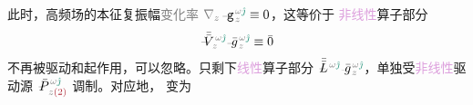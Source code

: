 此时，\textcolor{NavyBlue}{高频场}的\textcolor{PineGreen}{本征复振幅}\textcolor{gray}{变化率} $\mathcolor{gray}{\nabla_z} \xint{\begin{smallmatrix} ~ \\ {}^{}_{\mathcolor{gray}{-}} \\ ~ \end{smallmatrix}}{09}{\mathtt{g}}^{\;\!\mathcolor{gray}{\omega} \textcolor{PineGreen}{\hat{\jmath}}}_{\;\! \mathcolor{gray}{z}} \equiv 0$，这等价于 \textcolor{Plum}{非线性}算子部分
\begin{align} \label{eq:nonlinear(2)-wave_wkrho-EO-spectrum-V}
 \xint{\mathcolor{gray}{-}}{21}{\bar{\bar{V}}}^{\;\! \mathcolor{gray}{\omega} \textcolor{PineGreen}{\hat{\jmath}}}_{\;\! \mathcolor{gray}{z}} \xint{{}^{}_{\mathcolor{gray}{-}}}{10}{\bar{g}}^{\;\!\mathcolor{gray}{\omega} \textcolor{PineGreen}{\hat{\jmath}}}_{\;\! \mathcolor{gray}{z}} \equiv \bar{0}
\end{align} 
不再被驱动和起作用，可以忽略。只剩下\textcolor{Plum}{线性}算子部分 $\xint{\mathcolor{gray}{-}}{30}{\bar{\bar{L}}}^{\;\! \mathcolor{gray}{\omega} \textcolor{PineGreen}{\hat{\jmath}}} \xint{{}^{}_{\mathcolor{gray}{-}}}{10}{\bar{g}}^{\;\!\mathcolor{gray}{\omega} \textcolor{PineGreen}{\hat{\jmath}}}_{\;\! \mathcolor{gray}{z}}$，单独受\textcolor{Plum}{非线性}\textcolor{NavyBlue}{驱动源} $\xint{\mathcolor{gray}{-}}{25}{\bar{P}}^{\;\! \mathcolor{gray}{\omega} \textcolor{PineGreen}{\hat{\jmath}}}_{\;\! \mathcolor{gray}{z} \textcolor{Maroon}{(2)}}$ 调制。对应地， 变为
